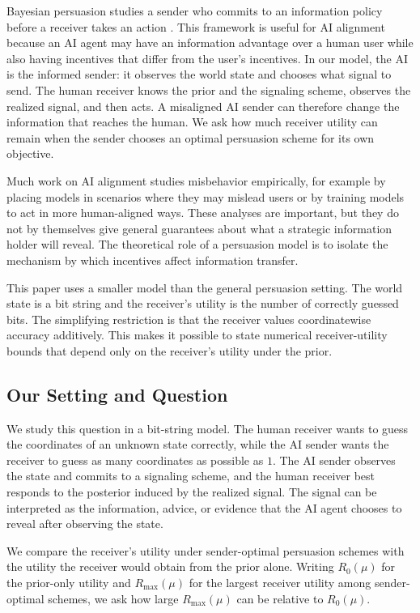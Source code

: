 \documentclass[format=acmsmall, review=false]{acmart}
\begin{document}
Bayesian persuasion studies a sender who commits to an information policy before
a receiver takes an action \cite{kamenica2011bayesian}. This framework is useful
for AI alignment because an AI agent may have an information advantage over a
human user while also having incentives that differ from the user's incentives.
In our model, the AI is the informed sender: it observes the world state and
chooses what signal to send. The human receiver knows the prior and the
signaling scheme, observes the realized signal, and then acts. A misaligned AI
sender can therefore change the information that reaches the human. We ask how
much receiver utility can remain when the sender chooses an optimal persuasion
scheme for its own objective.

Much work on AI alignment studies misbehavior empirically, for example by
placing models in scenarios where they may mislead users or by training models
to act in more human-aligned ways. These analyses are important, but they do not
by themselves give general guarantees about what a strategic information holder
will reveal. The theoretical role of a persuasion model is to isolate the
mechanism by which incentives affect information transfer.

This paper uses a smaller model than the general persuasion setting. The world
state is a bit string and the receiver's utility is the number of correctly
guessed bits. The simplifying restriction is that the receiver values
coordinatewise accuracy additively. This makes it possible to state numerical
receiver-utility bounds that depend only on the receiver's utility under the
prior.

\subsection{Our Setting and Question}

We study this question in a bit-string model. The human receiver wants to guess
the coordinates of an unknown state correctly, while the AI sender wants the
receiver to guess as many coordinates as possible as $1$. The AI sender observes
the state and commits to a signaling scheme, and the human receiver best
responds to the posterior induced by the realized signal. The signal can be
interpreted as the information, advice, or evidence that the AI agent chooses to
reveal after observing the state.

We compare the receiver's utility under sender-optimal persuasion schemes with
the utility the receiver would obtain from the prior alone. Writing $R_0(\mu)$
for the prior-only utility and $R_{\max}(\mu)$ for the largest receiver utility
among sender-optimal schemes, we ask how large $R_{\max}(\mu)$ can be relative
to $R_0(\mu)$.
\end{document}
